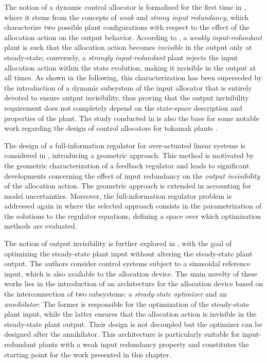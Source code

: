 The notion of a dynamic control allocator is formalized for the first time in \cite{zaccarian_dynamic_2009}, where it stems from the concepts of \emph{weak} and \emph{strong input redundancy}, which characterize two possible plant configurations with respect to the effect of the allocation action on the output behavior. According to \cite{zaccarian_dynamic_2009}, a \emph{weakly input-redundant} plant is such that the allocation action becomes \emph{invisible} in the output only at steady-state; conversely, a \emph{strongly input-redundant} plant rejects the input allocation action within the state evolution, making it invisible in the output at all times. As shown in the following, this characterization has been superseded by the introduction of a dynamic subsystem of the input allocator that is entirely devoted to ensure output invisibility, thus proving that the output invisibility requirement does not completely depend on the state-space description and properties of the plant. The study conducted in \cite{zaccarian_dynamic_2009} is also the base for some notable work regarding the design of control allocators for tokamak plants \cite{de_tommasi_nonlinear_2011,de_tommasi_trading_2009,di_grazia_current_2023,tenaglia_dynamic_2024}.

The design of a full-information regulator for over-actuated linear systems is considered in \cite{serrani_output_2012}, introducing a geometric approach. This method is motivated by the geometric characterization of a feedback regulator and leads to significant developments concerning the effect of input redundancy on the \emph{output invisibility} of the allocation action. The geometric approach is extended in \cite{cocetti_dynamic_2016,cocetti_linear_2018} accounting for model uncertainties. Moreover, the full-information regulator problem is addressed again in \cite{galeani_input_2015} where the selected approach consists in the parametrization of the solutions to the regulator equations, defining a space over which optimization methods are evaluated.

The notion of output invisibility is further explored in \cite{galeani_dynamic_2014,cristofaro_output_2014}, with the goal of optimizing the steady-state plant input without altering the steady-state plant output. The authors consider control systems subject to a sinusoidal reference input, which is also available to the allocation device. The main novelty of these works lies in the introduction of an architecture for the allocation device based on the interconnection of two subsystems: a \emph{steady-state optimizer} and an \emph{annihilator}. The former is responsible for the optimization of the steady-state plant input, while the latter ensures that the allocation action is invisible in the steady-state plant output. Their design is not decoupled but the optimizer can be designed after the annihilator. This architecture is particularly suitable for input-redundant plants with a weak input redundancy property and constitutes the starting point for the work presented in this chapter.

